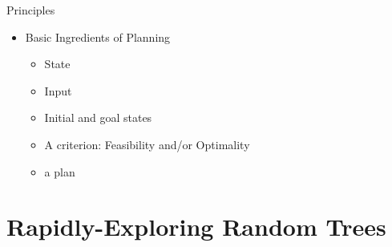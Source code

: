 \documentclass[%
  professionalfonts,%
  xcolor={%
    usenames,%
    dvipsnames,%
    svgnames,%
    table,%
    hyperref%
  }%
]{beamer}
\begin{document}
      \begin{frame}{Principles}
        \begin{itemize}
          \item Basic Ingredients of Planning
          \begin{itemize}
            \item State
            \item Input
            \item Initial and goal states
            \item A criterion: Feasibility and/or Optimality
            \item a plan
          \end{itemize}
        \end{itemize}
      \end{frame}
    
  \section{Rapidly-Exploring Random Trees}
    \begin{frame}
      \huge{}
    \end{frame}
    
\end{document}
